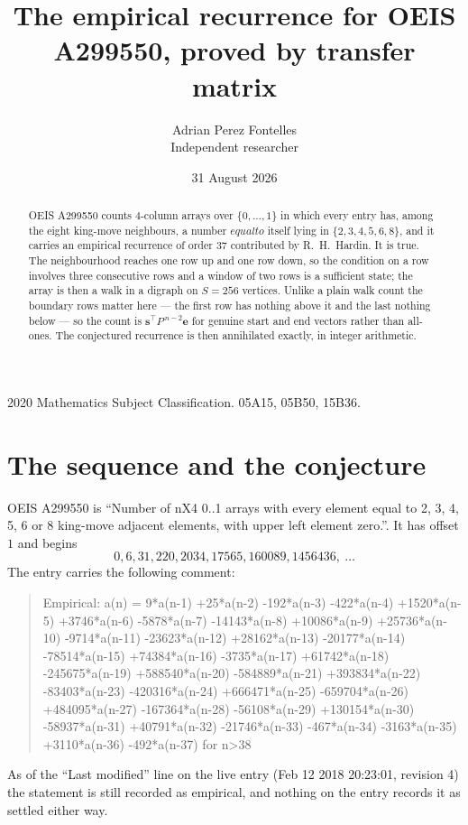 \documentclass[11pt,a4paper]{article}
\title{The empirical recurrence for OEIS A299550, proved by transfer matrix}
\author{Adrian Perez Fontelles\\ \small Independent researcher}
\date{31 August 2026}
\theoremstyle{plain}
\theoremstyle{definition}
\begin{document}
\maketitle

\begin{abstract}
OEIS A299550 counts $4$-column arrays over $\{0,\dots,1\}$ in which every entry has,
among the eight king-move neighbours, a number $equal to$ itself lying in $\{2,3,4,5,6,8\}$, and it carries an empirical
recurrence of order $37$ contributed by R.~H.~Hardin. It is true. The neighbourhood
reaches one row up and one row down, so the condition on a row involves three consecutive
rows and a window of two rows is a sufficient state; the array is then a walk in a digraph
on $S=256$ vertices. Unlike a plain walk count the boundary rows matter here --- the first
row has nothing above it and the last nothing below --- so the count is
$\mathbf{s}^{\!\top}P^{\,n-2}\mathbf{e}$ for genuine start and end vectors rather than
all-ones. The conjectured recurrence is then annihilated exactly, in integer arithmetic.
\end{abstract}

\noindent\small 2020 Mathematics Subject Classification. 05A15, 05B50, 15B36.\normalsize

\section{The sequence and the conjecture}

OEIS A299550 is ``Number of nX4 0..1 arrays with every element equal to 2, 3, 4, 5, 6 or 8 king-move adjacent elements, with upper left element zero.''. It has offset
$1$ and begins
\[
0, 6, 31, 220, 2034, 17565, 160089, 1456436,\ \dots
\]
The entry carries the following comment:
\begin{quote}\small
Empirical: a(n) = 9*a(n-1) +25*a(n-2) -192*a(n-3) -422*a(n-4) +1520*a(n-5) +3746*a(n-6) -5878*a(n-7) -14143*a(n-8) +10086*a(n-9) +25736*a(n-10) -9714*a(n-11) -23623*a(n-12) +28162*a(n-13) -20177*a(n-14) -78514*a(n-15) +74384*a(n-16) -3735*a(n-17) +61742*a(n-18) -245675*a(n-19) +588540*a(n-20) -584889*a(n-21) +393834*a(n-22) -83403*a(n-23) -420316*a(n-24) +666471*a(n-25) -659704*a(n-26) +484095*a(n-27) -167364*a(n-28) -56108*a(n-29) +130154*a(n-30) -58937*a(n-31) +40791*a(n-32) -21746*a(n-33) -467*a(n-34) -3163*a(n-35) +3110*a(n-36) -492*a(n-37) for n>38
\end{quote}
As of the ``Last modified'' line on the live entry (Feb 12 2018 20:23:01, revision
4) the statement is still recorded as empirical, and nothing on the entry
records it as settled either way.
\end{document}
